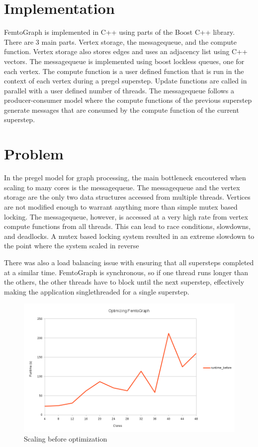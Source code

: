 \documentclass{sig-alternate-05-2015}
\begin{document}
\section{Implementation}
\justify
FemtoGraph is implemented in C++ using parts of the Boost C++ library. There are 3 main parts. Vertex storage, the messagequeue, and the compute function. Vertex storage also stores edges and uses  an adjacency list using C++ vectors. The messagequeue is implemented using boost lockless queues, one for each vertex. The compute function is a user defined function that is run in the context of each vertex during a pregel superstep. Update functions are called in parallel with a user defined number of threads. The messagequeue follows a producer-consumer model where the compute functions of the previous superstep generate messages that are consumed by the compute function of the current superstep.

\section{Problem}
\justify
In the pregel model for graph processing, the main bottleneck encoutered when scaling to many cores is the messagequeue. The messagequeue and the vertex storage are the only two data structures accessed from multiple threads. Vertices are not modified enough to warrant anything more than simple mutex based locking. The messagequeue, however, is accessed at a very high rate from vertex compute functions from all threads. This can lead to race conditions, slowdowns, and deadlocks. A mutex based locking system resulted in an extreme slowdown to the point where the system scaled in reverse

There was also a load balancing issue with ensuring that all supersteps completed at a similar time. FemtoGraph is synchronous, so if one thread runs longer than the others, the other threads have to block until the next superstep, effectively making the application singlethreaded for a single superstep.  

\begin{figure}
  \centering
  \includegraphics[width=\columnwidth]{before.png}
  \caption{Scaling before optimization}
\end{figure}
\end{document}
